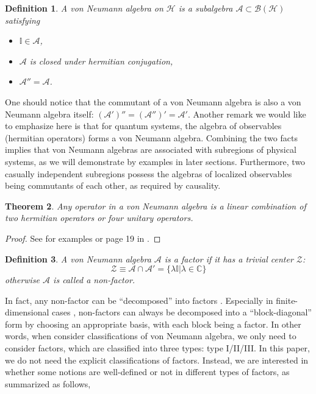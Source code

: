 \documentclass[a4paper,11pt]{article}
\newtheorem{thm}{Theorem}[section]
\newtheorem{defn}[thm]{Definition}
\renewcommand{\=}[1]{\stackrel{#1}{=}} %
\def\A{\mathcal{A}}
\def\B{\mathcal{B}}
\def\H{\mathcal{H}}
\def\C{\mathbb{C}}
\begin{document}
\begin{defn}
	A von Neumann algebra on $\H$ is a subalgebra $\A\subset\B(\H)$ satisfying
	\begin{itemize}
		\item $\mathbb{I}\in \A$,
		
		\item $\A$ is closed under hermitian conjugation,
		
		\item $\A''=\A$.
		
	\end{itemize} 
\end{defn}

One should notice that the commutant of a von Neumann algebra is also a von Neumann algebra itself: $(\A')''=(\A'')'=\A'$. Another remark we would like to emphasize here is that for quantum systems, the algebra of observables (hermitian operators) forms a von Neumann algebra. Combining the two facts implies that von Neumann algebras are associated with subregions of physical systems, as we will demonstrate by examples in later sections. Furthermore, two casually independent subregions possess the algebras of localized observables being commutants of each other, as required by causality.





\begin{thm}
	Any operator in a von Neumann algebra is a linear combination of two hermitian operators or four unitary operators.
\end{thm}

\begin{proof}
	See for examples \cite{Kang:2018xqy} or page 19 in \cite{Vaughan2009}.
\end{proof}


\begin{defn}
	A von Neumann algebra $\A$ is a factor if it has a trivial center $\mathcal{Z}$:
	\begin{equation}
		\mathcal{Z}\equiv \A\cap\A'=\{\lambda \mathbb{I}|\lambda\in\C\}
	\end{equation}
	otherwise $\A$ is called a non-factor.
\end{defn}

In fact, any non-factor can be ``decomposed'' into factors \cite{Sorce:2023fdx}. Especially in finite-dimensional cases \cite{Harlow:2016vwg}, non-factors can always be decomposed into a ``block-diagonal'' form by choosing an appropriate basis, with each block being a factor. In other words, when consider classifications of von Neumann algebra, we only need to consider factors, which are classified into three types: type I/II/III. In this paper, we do not need the explicit classifications of factors. Instead, we are interested in whether some notions are well-defined or not in different types of factors, as summarized as follows,
\end{document}
